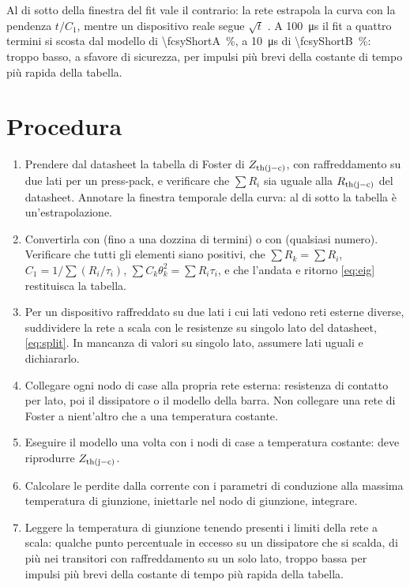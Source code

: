 \documentclass[10pt,a4paper]{scrartcl}
\let\newcommand\fcitdefine
\newcommand{\Zjc}{Z_\mathrm{th(j-c)}}
\newcommand{\Rjc}{R_\mathrm{th(j-c)}}
\newcommand{\code}[1]{\texttt{#1}}
\begin{document}
Al di sotto della finestra del fit vale il contrario: la rete estrapola la curva con la pendenza $t/C_1$, mentre un dispositivo reale segue $\sqrt{t}$ \cite{activeclamping}. A \SI{100}{\micro\second} il fit a quattro termini si scosta dal modello di \SI{\fcsyShortA}{\percent}, a \SI{10}{\micro\second} di \SI{\fcsyShortB}{\percent}: troppo basso, a sfavore di sicurezza, per impulsi più brevi della costante di tempo più rapida della tabella.

\section{Procedura}
\label{sec:procedure}
\begin{enumerate}
\item Prendere dal datasheet la tabella di Foster di $\Zjc$, con raffreddamento su due lati per un press-pack, e verificare che $\sum R_i$ sia uguale alla $\Rjc$ del datasheet. Annotare la finestra temporale della curva: al di sotto la tabella è un'estrapolazione.
\item Convertirla con  (fino a una dozzina di termini) o con  (qualsiasi numero). Verificare che tutti gli elementi siano positivi, che $\sum R_k = \sum R_i$, $C_1 = 1/\sum (R_i/\tau_i)$, $\sum C_k\theta_k^2 = \sum R_i\tau_i$, e che l'andata e ritorno \eqref{eq:eig} restituisca la tabella.
\item Per un dispositivo raffreddato su due lati i cui lati vedono reti esterne diverse, suddividere la rete a scala con le resistenze su singolo lato del datasheet, \eqref{eq:split}. In mancanza di valori su singolo lato, assumere lati uguali e dichiararlo.
\item Collegare ogni nodo di case alla propria rete esterna: resistenza di contatto per lato, poi il dissipatore o il modello della barra. Non collegare una rete di Foster a nient'altro che a una temperatura costante.
\item Eseguire il modello una volta con i nodi di case a temperatura costante: deve riprodurre $\Zjc$.
\item Calcolare le perdite dalla corrente con i parametri di conduzione alla massima temperatura di giunzione, iniettarle nel nodo di giunzione, integrare.
\item Leggere la temperatura di giunzione tenendo presenti i limiti della rete a scala: qualche punto percentuale in eccesso su un dissipatore che si scalda, di più nei transitori con raffreddamento su un solo lato, troppo bassa per impulsi più brevi della costante di tempo più rapida della tabella.
\end{enumerate}
\end{document}
